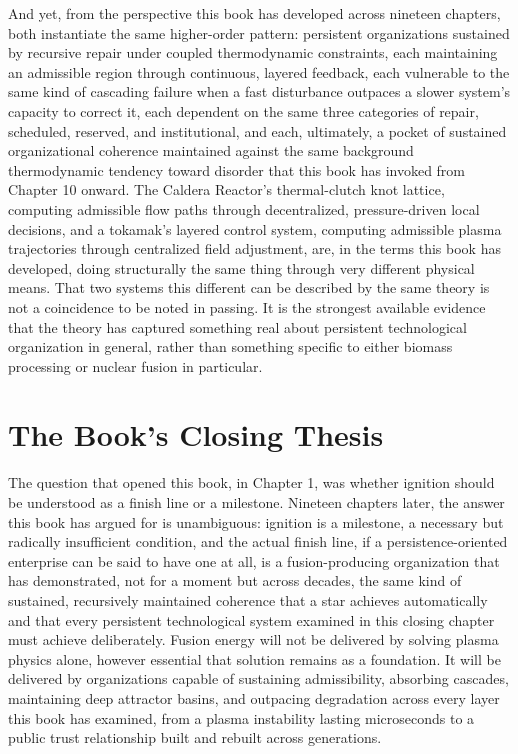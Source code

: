 And yet, from the perspective this book has developed across nineteen chapters, both instantiate the same higher-order pattern: persistent organizations sustained by recursive repair under coupled thermodynamic constraints, each maintaining an admissible region through continuous, layered feedback, each vulnerable to the same kind of cascading failure when a fast disturbance outpaces a slower system's capacity to correct it, each dependent on the same three categories of repair, scheduled, reserved, and institutional, and each, ultimately, a pocket of sustained organizational coherence maintained against the same background thermodynamic tendency toward disorder that this book has invoked from Chapter 10 onward. The Caldera Reactor's thermal-clutch knot lattice, computing admissible flow paths through decentralized, pressure-driven local decisions, and a tokamak's layered control system, computing admissible plasma trajectories through centralized field adjustment, are, in the terms this book has developed, doing structurally the same thing through very different physical means. That two systems this different can be described by the same theory is not a coincidence to be noted in passing. It is the strongest available evidence that the theory has captured something real about persistent technological organization in general, rather than something specific to either biomass processing or nuclear fusion in particular.

\section{The Book's Closing Thesis}

The question that opened this book, in Chapter 1, was whether ignition should be understood as a finish line or a milestone. Nineteen chapters later, the answer this book has argued for is unambiguous: ignition is a milestone, a necessary but radically insufficient condition, and the actual finish line, if a persistence-oriented enterprise can be said to have one at all, is a fusion-producing organization that has demonstrated, not for a moment but across decades, the same kind of sustained, recursively maintained coherence that a star achieves automatically and that every persistent technological system examined in this closing chapter must achieve deliberately. Fusion energy will not be delivered by solving plasma physics alone, however essential that solution remains as a foundation. It will be delivered by organizations capable of sustaining admissibility, absorbing cascades, maintaining deep attractor basins, and outpacing degradation across every layer this book has examined, from a plasma instability lasting microseconds to a public trust relationship built and rebuilt across generations.

